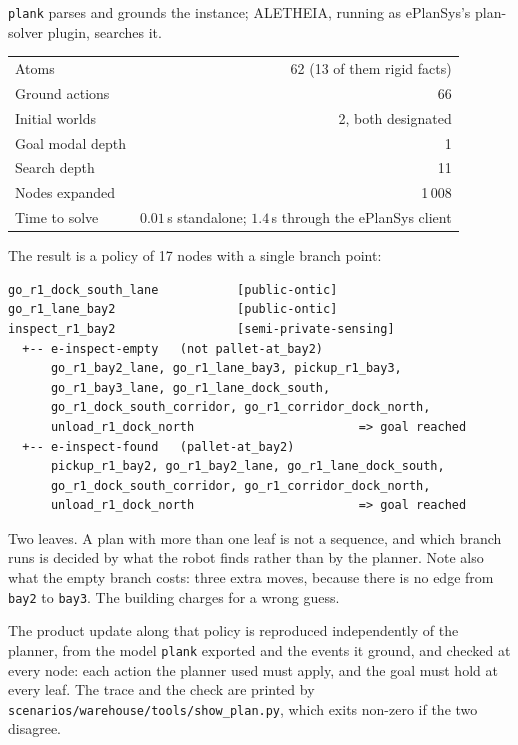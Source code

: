\documentclass[11pt,a4paper]{article}
\theoremstyle{definition}
\newcommand{\code}[1]{\texttt{\small #1}}
\begin{document}
\code{plank} parses and grounds the instance; ALETHEIA, running as ePlanSys's
plan-solver plugin, searches it.

\begin{center}
\begin{tabular}{@{}lr@{}}
\toprule
Atoms & 62 \quad (13 of them rigid facts) \\
Ground actions & 66 \\
Initial worlds & 2, both designated \\
Goal modal depth & 1 \\
Search depth & 11 \\
Nodes expanded & 1\,008 \\
Time to solve & $0.01$\,s standalone; $1.4$\,s through the ePlanSys client \\
\bottomrule
\end{tabular}
\end{center}

The result is a policy of 17 nodes with a single branch point:

\begin{lstlisting}
go_r1_dock_south_lane           [public-ontic]
go_r1_lane_bay2                 [public-ontic]
inspect_r1_bay2                 [semi-private-sensing]
  +-- e-inspect-empty   (not pallet-at_bay2)
      go_r1_bay2_lane, go_r1_lane_bay3, pickup_r1_bay3,
      go_r1_bay3_lane, go_r1_lane_dock_south,
      go_r1_dock_south_corridor, go_r1_corridor_dock_north,
      unload_r1_dock_north                       => goal reached
  +-- e-inspect-found   (pallet-at_bay2)
      pickup_r1_bay2, go_r1_bay2_lane, go_r1_lane_dock_south,
      go_r1_dock_south_corridor, go_r1_corridor_dock_north,
      unload_r1_dock_north                       => goal reached
\end{lstlisting}

Two leaves. A plan with more than one leaf is not a sequence, and which branch
runs is decided by what the robot finds rather than by the planner. Note also
what the empty branch costs: three extra moves, because there is no edge from
\code{bay2} to \code{bay3}. The building charges for a wrong guess.

The product update along that policy is reproduced independently of the
planner, from the model \code{plank} exported and the events it ground, and
checked at every node: each action the planner used must apply, and the goal
must hold at every leaf. The trace and the check are printed by
\code{scenarios/warehouse/tools/show\_plan.py}, which exits non-zero if the two
disagree.
\end{document}
